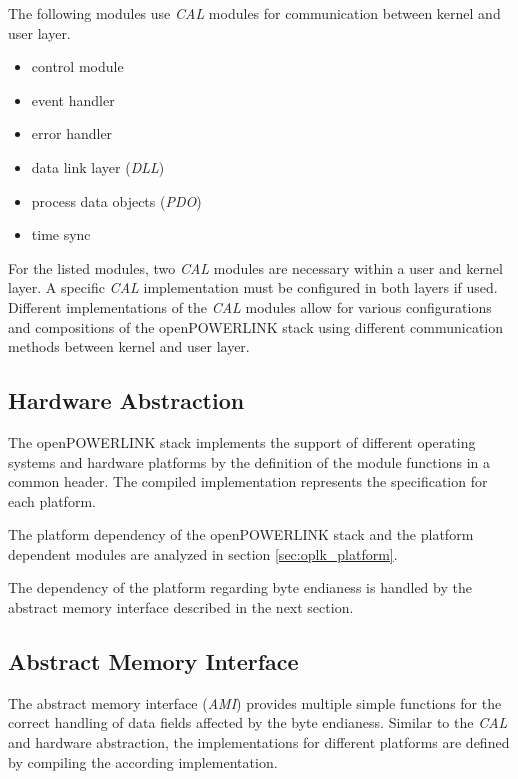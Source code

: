 The following modules use \emph{CAL} modules for communication between kernel and user layer. 

\begin{itemize}
    \item control module
    \item event handler
    \item error handler
    \item data link layer (\emph{DLL})
    \item process data objects (\emph{PDO})
    \item time sync
\end{itemize}

For the listed modules, two \emph{CAL} modules are necessary within a user and kernel layer.
A specific \emph{CAL} implementation must be configured in both layers if used.
Different implementations of the \emph{CAL} modules allow for various configurations and compositions of the openPOWERLINK stack using different communication methods between kernel and user layer. \cite[CAL]{openpowerlink_doc}

\subsection{Hardware Abstraction}
\label{sec:oplk_architecture_hardware}
The openPOWERLINK stack implements the support of different operating systems and hardware platforms by the definition of the module functions in a common header.
The compiled implementation represents the specification for each platform.

The platform dependency of the openPOWERLINK stack and the platform dependent modules are analyzed in section \ref{sec:oplk_platform}.

The dependency of the platform regarding byte endianess is handled by the abstract memory interface described in the next section.

\subsection{Abstract Memory Interface}
\label{sec:oplk_architecture_ami}

The abstract memory interface (\emph{AMI}) provides multiple simple functions for the correct handling of data fields affected by the byte endianess.
Similar to the \emph{CAL} and hardware abstraction, the implementations for different platforms are defined by compiling the according implementation. \cite[AMI]{openpowerlink_doc}
\\

